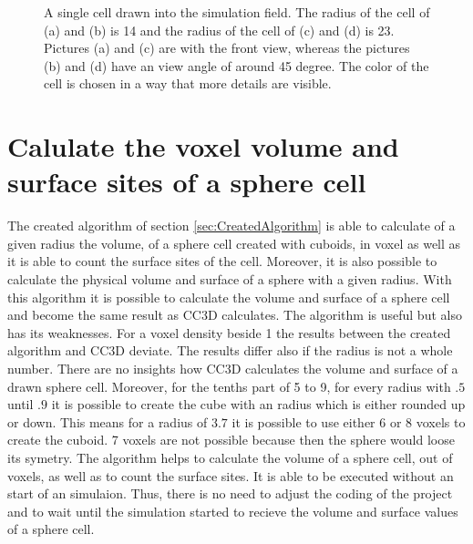 \begin{figure}[ht]
\begin{center}
{	}
	\end{center}
	\caption[Drawn sphere cells with a radius of 14 and 23]{\label{img:DrawnSphereCellRadius14And23}A single cell drawn into the simulation field. The radius of the cell of (a) and (b) is 14 and the radius of the cell of (c) and (d) is 23. Pictures (a) and (c) are with the front view, whereas the
pictures (b) and (d) have an view angle of around 45 degree. The color of the cell is chosen in
a way that more details are visible.}
\end{figure}


\section{Calulate the voxel volume and surface sites of a sphere cell}
The created algorithm of section \ref{sec:CreatedAlgorithm} is able to calculate of a given radius the volume, of a sphere cell created with cuboids, in voxel as well as it is able to count the surface sites of the cell. Moreover, it is also possible to calculate the physical volume and surface of a sphere with a given radius. With this algorithm it is possible to calculate the volume and surface of a sphere cell and become the same result as \ac{CC3D} calculates. \newline
The algorithm is useful but also has its weaknesses. For a voxel density beside 1 the results between the created algorithm and \ac{CC3D} deviate. The results differ also if the radius is not a whole number. There are no insights how \ac{CC3D} calculates the volume and surface of a drawn sphere cell. Moreover, for the tenths part of 5 to 9, for every radius with $.5$ until $.9$ it is possible to create the cube with an radius which is either rounded up or down. This means for a radius of $3.7$ it is possible to use either 6 or 8 voxels to create the cuboid. 7 voxels are not possible because then the sphere would loose its symetry. \newline
The algorithm helps to calculate the volume of a sphere cell, out of voxels, as well as to count the surface sites. It is able to be executed without an start of an simulaion. Thus, there is no need to adjust the coding of the project and to wait until the simulation started to recieve the volume and surface values of a sphere cell. 

